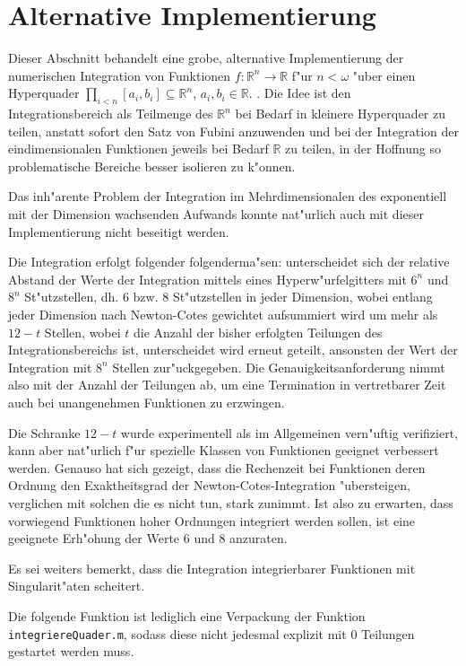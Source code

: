 \documentclass{scrartcl}
\begin{document}
\section{Alternative Implementierung}

Dieser Abschnitt behandelt eine grobe, alternative Implementierung der
numerischen Integration von Funktionen $f: \mathbb R^n \to \mathbb R$
f"ur $n < \omega$ "uber einen Hyperquader $\prod_{i < n} [a_i, b_i]
\subseteq \mathbb R^n$, $a_i, b_i \in \mathbb R$.
. Die Idee ist den Integrationsbereich als Teilmenge des $\mathbb R^n$
bei Bedarf in kleinere Hyperquader zu teilen, anstatt sofort den Satz von Fubini
anzuwenden und bei der Integration der eindimensionalen Funktionen jeweils
bei Bedarf $\mathbb R$ zu teilen, in der Hoffnung so problematische
Bereiche besser isolieren zu k"onnen.

Das inh"arente Problem der Integration im Mehrdimensionalen des
exponentiell mit der Dimension wachsenden Aufwands konnte nat"urlich auch
mit dieser Implementierung nicht beseitigt werden.

Die Integration erfolgt folgender folgenderma"sen:
unterscheidet sich der relative Abstand der Werte der Integration mittels eines
Hyperw"urfelgitters mit $6^n$ und
$8^n$ St"utzstellen, dh. $6$ bzw. $8$ St"utzstellen in jeder Dimension,
wobei entlang jeder Dimension nach Newton-Cotes gewichtet aufsummiert wird
um mehr als $12 - t$ Stellen, wobei $t$ die Anzahl der bisher erfolgten
Teilungen des Integrationsbereichs ist, unterscheidet wird erneut geteilt,
ansonsten der Wert der Integration mit $8^n$ Stellen zur"uckgegeben.
Die Genauigkeitsanforderung nimmt also mit der Anzahl der Teilungen ab,
um eine Termination in vertretbarer Zeit auch bei unangenehmen Funktionen
zu erzwingen.

Die Schranke $12 - t$ wurde experimentell als im Allgemeinen vern"uftig
verifiziert, kann aber nat"urlich f"ur spezielle Klassen von Funktionen
geeignet verbessert werden. Genauso hat sich gezeigt, dass die Rechenzeit
bei Funktionen deren Ordnung den Exaktheitsgrad der Newton-Cotes-Integration
"ubersteigen, verglichen mit solchen die es nicht tun, stark zunimmt.
Ist also zu erwarten, dass vorwiegend Funktionen hoher Ordnungen
integriert werden sollen, ist eine geeignete Erh"ohung der Werte $6$ und
$8$ anzuraten.

Es sei weiters bemerkt, dass die Integration integrierbarer Funktionen
mit Singularit"aten scheitert.



Die folgende Funktion ist lediglich eine Verpackung der Funktion
\lstinline|integriereQuader.m|, sodass diese nicht jedesmal explizit
mit $0$ Teilungen gestartet werden muss.




\end{document}
